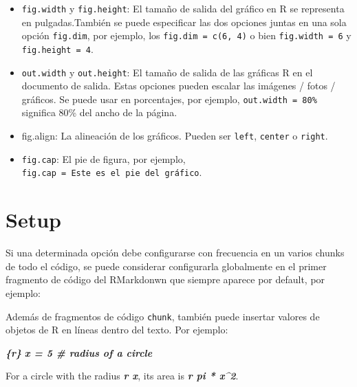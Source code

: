 \documentclass[
]{book}
\newenvironment{Shaded}{\begin{snugshade}}{\end{snugshade}}
\newcommand{\InformationTok}[1]{\textcolor[rgb]{0.56,0.35,0.01}{\textbf{\textit{#1}}}}
\newcommand{\NormalTok}[1]{#1}
\begin{document}
\begin{itemize}
\item
  \texttt{fig.width} y \texttt{fig.height}: El tamaño de salida del gráfico en R se representa en pulgadas.También se puede especificar las dos opciones juntas en una sola opción \texttt{fig.dim}, por ejemplo, los \texttt{fig.dim\ =\ c(6,\ 4)} o bien \texttt{fig.width\ =\ 6} y \texttt{fig.height\ =\ 4}.
\item
  \texttt{out.width} y \texttt{out.height}: El tamaño de salida de las gráficas R en el documento de salida. Estas opciones pueden escalar las imágenes / fotos / gráficos. Se puede usar en porcentajes, por ejemplo, \texttt{out.width\ =\ \textquotesingle{}80\%\textquotesingle{}} significa 80\% del ancho de la página.
\item
  fig.align: La alineación de los gráficos. Pueden ser \texttt{\textquotesingle{}left\textquotesingle{}}, \texttt{\textquotesingle{}center\textquotesingle{}} o \texttt{\textquotesingle{}right\textquotesingle{}}.
\item
  \texttt{fig.cap}: El pie de figura, por ejemplo, \texttt{fig.cap\ =\ \textquotesingle{}Este\ es\ el\ pie\ del\ gráfico\textquotesingle{}}.
\end{itemize}

\hypertarget{setup}{%
\section{Setup}\label{setup}}

Si una determinada opción debe configurarse con frecuencia en un varios chunks de todo el código, se puede considerar configurarla globalmente en el primer fragmento de código del RMarkdonwn que siempre aparece por default, por ejemplo:

\begin{Shaded}
\end{Shaded}

Además de fragmentos de código \texttt{chunk}, también puede insertar valores de objetos de R en líneas dentro del texto. Por ejemplo:

\begin{Shaded}
\begin{Highlighting}[]
\InformationTok{\textasciigrave{}\textasciigrave{}\textasciigrave{}\{r\}}
\InformationTok{x = 5  \# radius of a circle}
\InformationTok{\textasciigrave{}\textasciigrave{}\textasciigrave{}}

\NormalTok{For a circle with the radius }\InformationTok{\textasciigrave{}r x\textasciigrave{}}\NormalTok{,}
\NormalTok{its area is }\InformationTok{\textasciigrave{}r pi * x\^{}2\textasciigrave{}}\NormalTok{.}
\end{Highlighting}
\end{Shaded}
\end{document}
